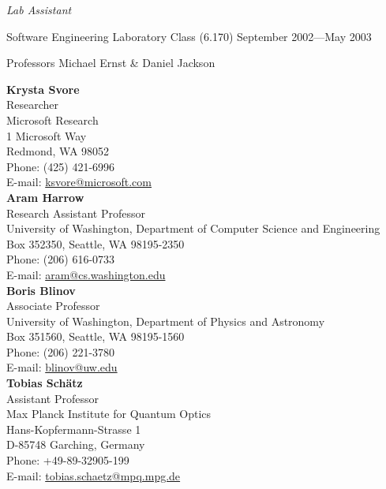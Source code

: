 \documentclass[letter]{article}
\begin{document}
\vspace{0.5\baselineskip}
\par
{\em Lab Assistant}
\par
Software Engineering Laboratory Class (6.170) \hfill September 2002---May 2003
\par
Professors Michael Ernst \& Daniel Jackson
\par

\vspace{\baselineskip}
\newpage

{\bf Krysta Svore}
\\
Researcher\\
Microsoft Research\\
1 Microsoft Way\\
Redmond, WA 98052\\
Phone: (425) 421-6996\\
E-mail: \url{ksvore@microsoft.com}\\

{\bf Aram Harrow}\\
Research Assistant Professor\\
University of Washington, Department of Computer Science and Engineering\\
Box 352350, Seattle, WA 98195-2350\\
Phone: (206) 616-0733\\
E-mail: \url{aram@cs.washington.edu}\\

{\bf Boris Blinov}\\
Associate Professor\\
University of Washington, Department of Physics and Astronomy\\
Box 351560, Seattle, WA 98195-1560\\
Phone: (206) 221-3780\\
E-mail: \url{blinov@uw.edu}\\

{\bf Tobias Sch\"atz}\\
Assistant Professor\\
Max Planck Institute for Quantum Optics\\
Hans-Kopfermann-Strasse 1\\
D-85748 Garching, Germany\\
Phone: +49-89-32905-199\\
E-mail: \url{tobias.schaetz@mpq.mpg.de}\\
\end{document}
